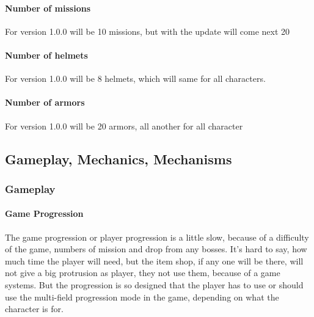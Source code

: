 \documentclass[parskip=full]{scrartcl}
\begin{document}
					\paragraph{Number of missions} \vspace{-5mm}
						\par \begingroup
						\leftskip=2cm
						\noindent
								For version 1.0.0 will be 10 missions, but with the update will come next 20
						\par \endgroup
					\paragraph{Number of helmets} \vspace{-5mm}
						\par \begingroup
						\leftskip=2cm
						\noindent	
								For version 1.0.0 will be 8 helmets, which will same for all characters.
						\par \endgroup
					\paragraph{Number of armors} \vspace{-5mm}
						\par \begingroup
						\leftskip=2cm
						\noindent
								For version 1.0.0 will be 20 armors, all another for all character
						\par \endgroup
			\subsection{Gameplay, Mechanics, Mechanisms} \vspace{-5mm}
				\subsubsection{Gameplay} \vspace{-5mm}
					\paragraph{Game Progression} \vspace{-5mm}
						\par \begingroup
						\leftskip=2cm
						\noindent
								The game progression or player progression is a little slow, because of a difficulty of the game, numbers of mission and drop from any bosses. It’s hard to say, how much time the player will need, but the item shop, if any one will be there, will not give a big  protrusion as player, they not use them, because of a game systems. But the progression is so designed that the player has to use or should use the multi-field progression mode in the game, depending on what the character is for.
						\par \endgroup
\end{document}
